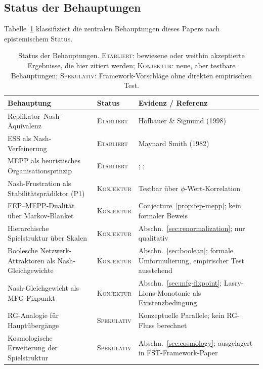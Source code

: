 \documentclass[12pt,a4paper]{article}
\theoremstyle{remark}
\begin{document}
\subsection{Status der Behauptungen}

Tabelle~\ref{tab:status-claims} klassifiziert die zentralen Behauptungen dieses Papers nach epistemischem Status.

\begin{table}[htbp]
\centering
\caption{Status der Behauptungen. \textsc{Etabliert}: bewiesene oder weithin akzeptierte Ergebnisse, die hier zitiert werden; \textsc{Konjektur}: neue, aber testbare Behauptungen; \textsc{Spekulativ}: Framework-Vorschl\"age ohne direkten empirischen Test.}
\label{tab:status-claims}
\small
\begin{tabular}{p{4.8cm}lp{5.2cm}}
\toprule
\textbf{Behauptung} & \textbf{Status} & \textbf{Evidenz / Referenz} \\
\midrule
Replikator--Nash-\"Aquivalenz & \textsc{Etabliert} & Hofbauer \& Sigmund (1998) \\
ESS als Nash-Verfeinerung & \textsc{Etabliert} & Maynard Smith (1982) \\
MEPP als heuristisches Organisationsprinzip & \textsc{Etabliert} & \citet{Martyushev2010}; \citet{Toma2025}; \citet{EcosystemMEPP} \\
Nash-Frustration als Stabilit\"atspr\"adiktor (P1) & \textsc{Konjektur} & Testbar \"uber $\phi$-Wert-Korrelation \\
FEP--MEPP-Dualit\"at \"uber Markov-Blanket & \textsc{Konjektur} & Conjecture~\ref{prop:fep-mepp}; kein formaler Beweis \\
Hierarchische Spielstruktur \"uber Skalen & \textsc{Konjektur} & Abschn.~\ref{sec:renormalization}; nur qualitativ \\
Boolesche Netzwerk-Attraktoren als Nash-Gleichgewichte & \textsc{Konjektur} & Abschn.~\ref{sec:boolean}; formale Umformulierung, empirischer Test ausstehend \\
Nash-Gleichgewicht als MFG-Fixpunkt & \textsc{Konjektur} & Abschn.~\ref{sec:mfg-fixpoint}; Lasry-Lions-Monotonie als Existenzbedingung \\
RG-Analogie f\"ur Haupt\"uberg\"ange & \textsc{Spekulativ} & Konzeptuelle Parallele; kein RG-Fluss berechnet \\
Kosmologische Erweiterung der Spielstruktur & \textsc{Spekulativ} & Abschn.~\ref{sec:cosmology}; ausgelagert in FST-Framework-Paper \\
\bottomrule
\end{tabular}
\end{table}
\end{document}
